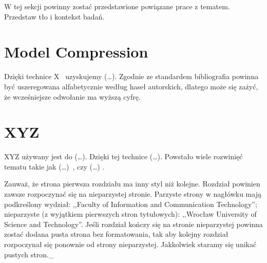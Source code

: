 \label{chapter:related}
W tej sekcji powinny zostać przedstawione powiązane prace z tematem. Przedstaw tło i kontekst badań.

\section{Model Compression}

Dzięki technice X~\cite{nowak2016} uzyskujemy (\dots). Zgodnie ze standardem bibliografia powinna być uszeregowana alfabetycznie według haseł autorskich, dlatego może się zażyć, że wcześniejsze odwołanie ma wyższą cyfrę. 

\section{XYZ}
XYZ używany jest do (\dots). Dzięki tej technice (\dots). Powstało wiele rozwinięć tematu takie jak (\dots)~\cite{nowak2018, w4n2017}, czy (\dots) \cite{babington2008}.

Zauważ, że strona pierwsza rozdziału ma inny styl niż kolejne. Rozdział powinien zawsze rozpoczynać się na nieparzystej stronie. Parzyste strony w nagłówku mają podkreślony wydział: ,,Faculty of Information and Communication Technology''; nieparzyste (z wyjątkiem pierwszych stron tytułowych): ,,Wrocław University of Science and Technology''. Jeśli rozdział kończy się na stronie nieparzystej powinna zostać dodana pusta strona bez formatowania, tak aby kolejny rozdział rozpoczynał się ponownie od strony nieparzystej. Jakkolwiek staramy się unikać pustych stron.\_